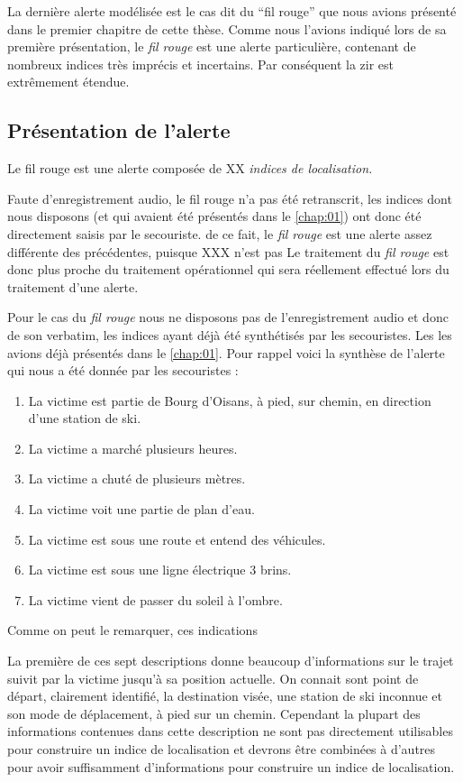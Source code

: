 
La dernière alerte modélisée est le cas dit du \enquote{fil rouge} que
nous avions présenté dans le premier chapitre de cette thèse. Comme
nous l'avions indiqué lors de sa première présentation, le \emph{fil
  rouge} est une alerte particulière, contenant de nombreux indices
très imprécis et incertains. Par conséquent la \ac{zir} est
extrêmement étendue.


\subsection{Présentation de l'alerte}
\label{subsec:9-4-1}

Le fil rouge est une alerte composée de XX \emph{indices de
  localisation.}


Faute d'enregistrement audio, le fil rouge n'a pas été retranscrit,
les indices dont nous disposons (et qui avaient été présentés dans le
\autoref{chap:01}) ont donc été directement saisis par le secouriste.
%
de ce fait, le \emph{fil rouge} est une alerte assez différente des
précédentes, puisque XXX n'est pas
%
Le traitement du \emph{fil rouge} est donc plus proche du traitement
opérationnel qui sera réellement effectué lors du traitement d'une
alerte.


Pour le cas du \emph{fil rouge} nous ne disposons pas de
l'enregistrement audio et donc de son verbatim, les indices ayant déjà 
été synthétisés par les secouristes. Les les avions déjà présentés
dans le \autoref{chap:01}.
%
Pour rappel voici la synthèse de l'alerte qui nous a été donnée par
les secouristes :
%
\begin{enumerate}
\item La victime est partie de Bourg d'Oisans, à pied, sur chemin, en
  direction d'une station de ski.
\item La victime a marché plusieurs heures.
\item La victime a chuté de plusieurs mètres.
\item La victime voit une partie de plan d'eau.
\item La victime est sous une route et entend des véhicules.
\item La victime est sous une ligne électrique 3 brins.
\item La victime vient de passer du soleil à l'ombre.
\end{enumerate}


Comme on peut le remarquer, ces indications 

La première de ces sept descriptions donne beaucoup d'informations sur
le trajet suivit par la victime jusqu'à sa position actuelle. On
connait sont point de départ, clairement identifié, la destination
visée, une station de ski inconnue et son mode de déplacement, à pied
sur un chemin. Cependant la plupart des informations contenues dans
cette description ne sont pas directement utilisables pour construire
un indice de localisation et devrons être combinées à d'autres pour
avoir suffisamment d'informations pour construire un indice de
localisation. 

